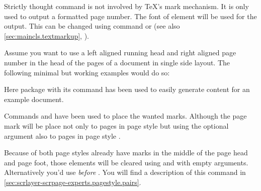 Strictly thought command  is not involved by \TeX's mark
mechanism. It is only used to output a formatted page number.
%
The font of element
 will be used for
the output. This can be changed using command  or
 (see also \autoref{sec:maincls.textmarkup},
).%
%
\ifCommonscrlayerscrpage%
\begin{Example}
  Assume\label{example.scrlayer-scrpage.headmark} you want to use a left
  aligned running head and right aligned page
  number in the head of the pages of a document in single side layout. The
  following minimal but working examples would do so:
  Here package  with its command
   has been used to easily
  generate content for an example document.

  Commands  and  have been used to place the wanted
  marks. Although the page mark will be place not only to pages in page style
   but using the optional argument also to pages in
  page style .

  Because of both page styles already have marks in the middle of the page
  head and page foot, those elements will be cleared using  and
   with empty arguments. Alternatively you'd use
   \emph{before} . You will find a
  description of this command in
  \autoref{sec:scrlayer-scrpage-experts.pagestyle.pairs}.
\end{Example}


